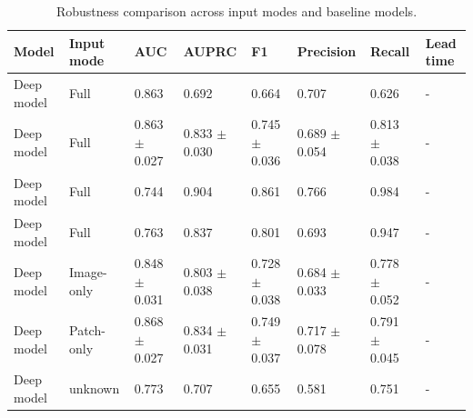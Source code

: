 \begin{table}[htbp]
\centering
\caption{Robustness comparison across input modes and baseline models.}
\label{tab:robustness_comparison}
\begin{tabular}{llllllll}
\hline
Model & Input mode & AUC & AUPRC & F1 & Precision & Recall & Lead time \\
\hline
Deep model & Full & 0.863 & 0.692 & 0.664 & 0.707 & 0.626 & - \\
Deep model & Full & 0.863 $\pm$ 0.027 & 0.833 $\pm$ 0.030 & 0.745 $\pm$ 0.036 & 0.689 $\pm$ 0.054 & 0.813 $\pm$ 0.038 & - \\
Deep model & Full & 0.744 & 0.904 & 0.861 & 0.766 & 0.984 & - \\
Deep model & Full & 0.763 & 0.837 & 0.801 & 0.693 & 0.947 & - \\
Deep model & Image-only & 0.848 $\pm$ 0.031 & 0.803 $\pm$ 0.038 & 0.728 $\pm$ 0.038 & 0.684 $\pm$ 0.033 & 0.778 $\pm$ 0.052 & - \\
Deep model & Patch-only & 0.868 $\pm$ 0.027 & 0.834 $\pm$ 0.031 & 0.749 $\pm$ 0.037 & 0.717 $\pm$ 0.078 & 0.791 $\pm$ 0.045 & - \\
Deep model & unknown & 0.773 & 0.707 & 0.655 & 0.581 & 0.751 & - \\
\hline
\end{tabular}
\end{table}